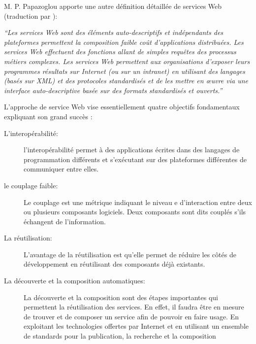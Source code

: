   M. P. Papazoglou \cite{papazoglou2003service} apporte une autre
  définition détaillée de services Web (traduction par
  \cite{driss2011approche}):

  \textit{``Les services Web sont des éléments auto-descriptifs et
    indépendants des plateformes permettent la composition faible coût
    d’applications distribuées. Les services Web effectuent des
    fonctions allant de simples requêtes des processus métiers
    complexes. Les services Web permettent aux organisations d'exposer
    leurs programmes résultats sur Internet (ou sur un intranet) en
    utilisant des langages (basés sur XML) et des protocoles
    standardisés et de les mettre en œuvre via une interface
    auto-descriptive basée sur des formats standardisés et ouverts.''}

  L'approche de service Web vise essentiellement quatre objectifs
  fondamentaux expliquant son grand succès \cite{driss2011approche}:

  \renewcommand{\descriptionlabel}[1]{\hspace{0.5cm}\textbullet~\textsf{#1}}
  \begin{description}
  \item [L'interopérabilité:] l'interopérabilité permet à des
    applications écrites dans des langages de programmation différents
    et s'exécutant sur des plateformes différentes de communiquer
    entre elles.

  \item [le couplage faible:] Le couplage est une métrique indiquant
    le niveau e d'interaction entre deux ou plusieurs composants
    logiciels. Deux composants sont dits couplés s'ils échangent de
    l'information.

  \item [La réutilisation:] L'avantage de la réutilisation est qu'elle
    permet de réduire les  côtés de développement en réutilisant
    des composants déjà existants.

  \item [La découverte et la composition automatiques:] La découverte
    et la composition sont des étapes importantes qui permettent la
    réutilisation des services. En effet, il faudra être en mesure de
    trouver et de composer un service afin de pouvoir en faire
    usage. En exploitant les technologies offertes par Internet et en
    utilisant un ensemble de standards pour la publication, la
    recherche et la composition
  \end{description}
  \enddescription


